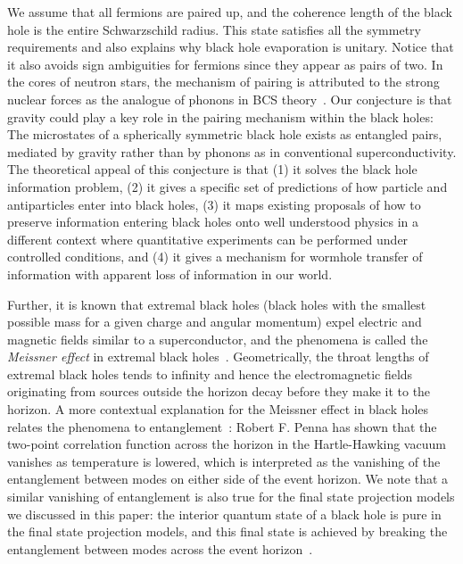 \documentclass[12pt,letterpaper,aps,onecolumn,superscriptaddress,floatfix,notitlepage]{revtex4-1}
\begin{document}
	We assume that all fermions are paired up, and the coherence length of the black hole is the entire Schwarzschild radius. This state satisfies all the symmetry requirements and also explains why black hole evaporation is unitary. Notice that it also avoids sign ambiguities for fermions since they appear as pairs of two. In the cores of neutron stars, the mechanism of pairing is attributed to the strong nuclear forces as the analogue of phonons in BCS theory~\cite{superfluidity,neutron2,neutron1}. Our conjecture is that gravity could play a key role in the pairing mechanism within the black holes: The microstates of a spherically symmetric black hole exists as entangled pairs, mediated by gravity rather than by phonons as in conventional superconductivity.  The theoretical appeal of this conjecture is that (1) it solves the black hole information problem, (2) it gives a specific set of predictions of how particle and antiparticles enter into black holes, (3) it maps existing proposals of how to preserve information entering black holes onto well understood physics in a different context where quantitative experiments can be performed under controlled conditions, and (4) it gives a mechanism for wormhole transfer of information with apparent loss of information in our world.
	
	Further, it is known that extremal black holes (black holes with the smallest possible mass for a given charge and angular momentum) expel electric and magnetic fields similar to a superconductor, and the phenomena is called the \textit{Meissner effect} in extremal black holes~\cite{king1975black}. Geometrically, the throat lengths of extremal black holes tends to infinity and hence the electromagnetic fields originating from sources outside the horizon  decay before they make it to the horizon. A more contextual explanation for the Meissner effect in black holes relates the phenomena to entanglement~\cite{penna2014black}: Robert F. Penna has shown that the two-point correlation function across the horizon in the Hartle-Hawking vacuum vanishes as temperature is lowered, which is interpreted as the vanishing of the entanglement between modes on either side of the event horizon. We note that a similar vanishing of entanglement is also true for the final state projection models we discussed in this paper: the interior quantum state of a black hole is pure in the final state projection models, and this final state is achieved by breaking the entanglement between modes across the event horizon~\cite{projection,horowitz}.
	
\end{document}
